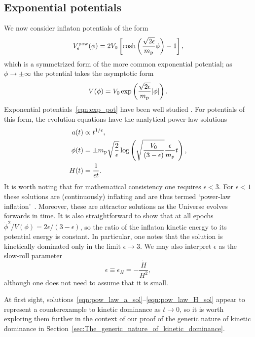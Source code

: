 \subsection{Exponential potentials}
\label{sec:Exponential_potentials}
We now consider inflaton potentials of the form 
%
\begin{equation}
  V^\mathrm{pow}_\epsilon(\phi) 
  = 
  2V_0\left[
  \cosh\left(\frac{\sqrt{2\epsilon}}{m_{\mathrm{p}}}\phi\right)-1
  \right],
  \label{eqn:coshpot}
\end{equation}
%
which is a symmetrized form of the more common exponential potential; as $\phi\rightarrow\pm\infty$ the potential takes the asymptotic form
%
\begin{equation}
  V(\phi) 
  = 
  V_0 \exp\left(\frac{\sqrt{2\epsilon}}{m_{\mathrm{p}}} |\phi|\right).
  \label{eqn:exp_pot}
\end{equation}
%
Exponential potentials~\eqref{eqn:exp_pot} have been well studied \citep{yokoyama_dynamics_1988}. For potentials of this form, the evolution equations have the analytical power-law solutions
%
\begin{align}
  a(t) 
  &\propto 
  {t}^{1/\epsilon},
  \label{eqn:pow_law_a_sol}
  \\
  \phi(t)
  &=
  \pm m_{\mathrm{p}}\sqrt{\frac{2}{\epsilon}}
  \log\left(\sqrt{\frac{V_0}{\left(3-\epsilon\right)}}
  \frac{\epsilon}{m_{\mathrm{p}}} t\right),
  \\
  H(t)
  &=
  \frac{1}{\epsilon t}.  
  \label{eqn:pow_law_H_sol}
\end{align}
%
It is worth noting that for mathematical consistency one requires $\epsilon < 3$. For $\epsilon<1$ these solutions are (continuously) inflating and are thus termed `power-law inflation'~\citep{lucchin_power-law_1985}. Moreover, these are attractor solutions as the Universe evolves forwards in time. It is also straightforward to show that at all epochs $\dot{\phi}^2/V(\phi) = 2\epsilon/(3-\epsilon)$, so the ratio of the inflaton kinetic energy to its potential energy is constant. In particular, one notes that the solution is kinetically dominated only in the limit $\epsilon \to 3$.  We may also interpret $\epsilon$ as the slow-roll parameter 
%
\begin{equation}
  \epsilon\equiv\epsilon_H = -\frac{\dot{H}}{H^2},
\end{equation}
%
although one does not need to assume that it is small.

At first sight, solutions~\eqref{eqn:pow_law_a_sol}--\eqref{eqn:pow_law_H_sol} appear to represent a counterexample to kinetic dominance as $t \to 0$, so it is worth exploring them further in the context of our proof of the generic nature of kinetic dominance in Section~\ref{sec:The_generic_nature_of_kinetic_dominance}. 

